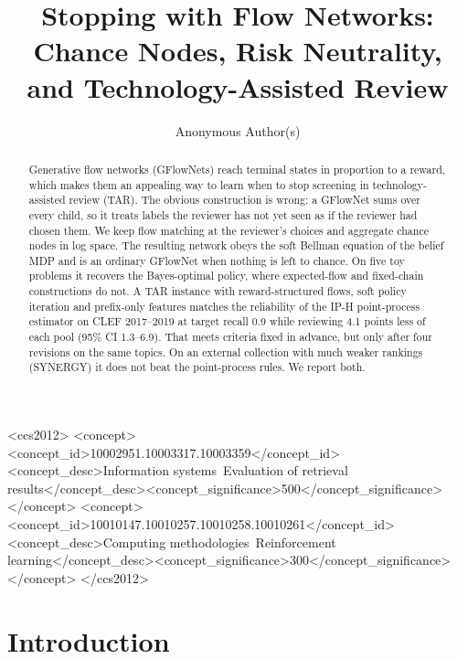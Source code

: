 \documentclass[sigconf,review,anonymous]{acmart}
\begin{document}
\title{Stopping with Flow Networks: Chance Nodes, Risk Neutrality, and Technology-Assisted Review}

\author{Anonymous Author(s)}

\begin{abstract}
Generative flow networks (GFlowNets) reach terminal states in proportion to a reward, which makes them an appealing way to learn when to stop screening in technology-assisted review (TAR). The obvious construction is wrong: a GFlowNet sums over every child, so it treats labels the reviewer has not yet seen as if the reviewer had chosen them. We keep flow matching at the reviewer's choices and aggregate chance nodes in log space. The resulting network obeys the soft Bellman equation of the belief MDP and is an ordinary GFlowNet when nothing is left to chance. On five toy problems it recovers the Bayes-optimal policy, where expected-flow and fixed-chain constructions do not. A TAR instance with reward-structured flows, soft policy iteration and prefix-only features matches the reliability of the IP-H point-process estimator on CLEF 2017--2019 at target recall 0.9 while reviewing 4.1 points less of each pool (95\% CI 1.3--6.9). That meets criteria fixed in advance, but only after four revisions on the same topics. On an external collection with much weaker rankings (SYNERGY) it does not beat the point-process rules. We report both.
\end{abstract}

\begin{CCSXML}
<ccs2012>
<concept><concept_id>10002951.10003317.10003359</concept_id><concept_desc>Information systems~Evaluation of retrieval results</concept_desc><concept_significance>500</concept_significance></concept>
<concept><concept_id>10010147.10010257.10010258.10010261</concept_id><concept_desc>Computing methodologies~Reinforcement learning</concept_desc><concept_significance>300</concept_significance></concept>
</ccs2012>
\end{CCSXML}

\maketitle

\section{Introduction}
\end{document}

